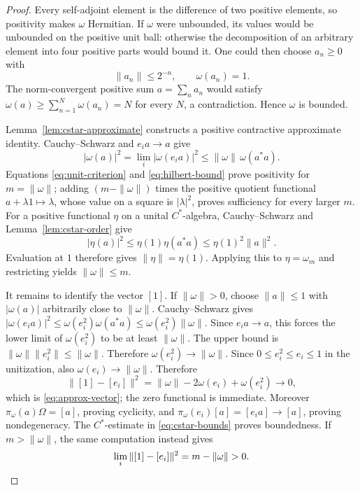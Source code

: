 \begin{proof}
Every self-adjoint element is the difference of two positive elements,
so positivity makes $\omega$ Hermitian.  If $\omega$ were unbounded, its
values would be unbounded on the positive unit ball: otherwise the
decomposition of an arbitrary element into four positive parts would
bound it.  One could then choose $a_n\geq0$ with
\[
 \|a_n\|\leq2^{-n},\qquad \omega(a_n)=1.
\]
The norm-convergent positive sum $a=\sum_na_n$ would satisfy
$\omega(a)\geq\sum_{n=1}^N\omega(a_n)=N$ for every $N$, a
contradiction.  Hence $\omega$ is bounded.

Lemma~\ref{lem:cstar-approximate} constructs a positive contractive
approximate identity.  Cauchy--Schwarz and
$e_i a\to a$ give
\begin{equation}
 |\omega(a)|^2
 =\lim_i|\omega(e_i a)|^2
 \leq\|\omega\|\,\omega(a^*a).
 \label{eq:hilbert-bound}
\end{equation}
Equations \eqref{eq:unit-criterion} and \eqref{eq:hilbert-bound} prove
positivity for $m=\|\omega\|$; adding $(m-\|\omega\|)$ times the
positive quotient functional $a+\lambda1\mapsto\lambda$, whose value
on a square is $|\lambda|^2$, proves
sufficiency for every larger $m$.  For a positive functional $\eta$ on a
unital $C^*$-algebra, Cauchy--Schwarz and Lemma~\ref{lem:cstar-order} give
\[
 |\eta(a)|^2\leq\eta(1)\eta(a^*a)
             \leq\eta(1)^2\|a\|^2.
\]
Evaluation at $1$ therefore gives $\|\eta\|=\eta(1)$.
Applying this to $\eta=\omega_m$ and restricting yields $\|\omega\|\leq m$.

It remains to identify the vector $[1]$.  If $\|\omega\|>0$, choose
$\|a\|\leq1$ with $|\omega(a)|$ arbitrarily close to $\|\omega\|$.
Cauchy--Schwarz gives
$|\omega(e_i a)|^2\leq\omega(e_i^2)\omega(a^*a)
\leq\omega(e_i^2)\|\omega\|$.
Since $e_i a\to a$, this forces the lower limit of $\omega(e_i^2)$ to be
at least $\|\omega\|$.  The upper bound is $\|\omega\|\|e_i^2\|\leq\|\omega\|$.
Therefore $\omega(e_i^2)\to\|\omega\|$.
Since $0\leq e_i^2\leq e_i\leq1$ in the unitization, also
$\omega(e_i)\to\|\omega\|$.  Therefore
\[
 \|[1]-[e_i]\|^2
 =\|\omega\|-2\omega(e_i)+\omega(e_i^2)\longrightarrow0,
\]
which is \eqref{eq:approx-vector}; the zero functional is immediate.
Moreover $\pi_\omega(a)\Omega=[a]$, proving cyclicity, and
$\pi_\omega(e_i)[a]=[e_i a]\to[a]$, proving nondegeneracy.  The
$C^*$-estimate in \eqref{eq:cstar-bounds} proves boundedness.  If
$m>\|\omega\|$, the same computation instead gives
\[
 \lim_i\|[1]-[e_i]\|^2=m-\|\omega\|>0.\qedhere
\]
\end{proof}

